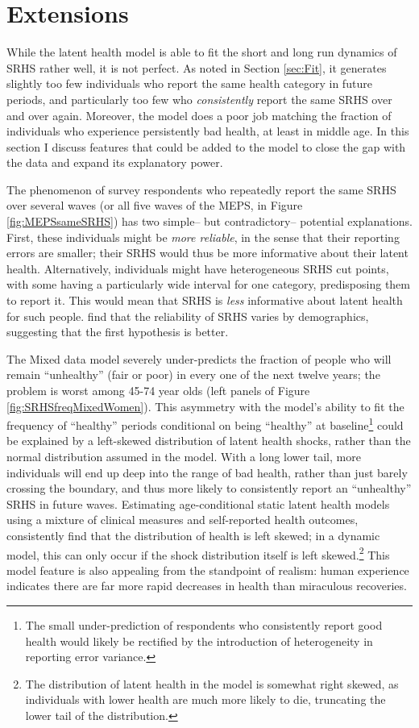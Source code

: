 \section{Extensions}\label{sec:Extensions}

While the latent health model is able to fit the short and long run dynamics of SRHS rather well, it is not perfect.  As noted in Section \ref{sec:Fit}, it generates slightly too few individuals who report the same health category in future periods, and particularly too few who \textit{consistently} report the same SRHS over and over again.  Moreover, the model does a poor job matching the fraction of individuals who experience persistently bad health, at least in middle age.  In this section I discuss features that could be added to the model to close the gap with the data and expand its explanatory power.

The phenomenon of survey respondents who repeatedly report the same SRHS over several waves (or all five waves of the MEPS, in Figure \ref{fig:MEPSsameSRHS}) has two simple-- but contradictory-- potential explanations.  First, these individuals might be \textit{more reliable}, in the sense that their reporting errors are smaller; their SRHS would thus be more informative about their latent health.  Alternatively, individuals might have heterogeneous SRHS cut points, with some having a particularly wide interval for one category, predisposing them to report it.  This would mean that SRHS is \textit{less} informative about latent health for such people.  \cite{Crossley02} find that the reliability of SRHS varies by demographics, suggesting that the first hypothesis is better.

The Mixed data model severely under-predicts the fraction of people who will remain ``unhealthy'' (fair or poor) in every one of the next twelve years; the problem is worst among 45-74 year olds (left panels of Figure \ref{fig:SRHSfreqMixedWomen}).  This asymmetry with the model's ability to fit the frequency of ``healthy'' periods conditional on being ``healthy'' at baseline\footnote{The small under-prediction of respondents who consistently report good health would likely be rectified by the introduction of heterogeneity in reporting error variance.} could be explained by a left-skewed distribution of latent health shocks, rather than the normal distribution assumed in the model.  With a long lower tail, more individuals will end up deep into the range of bad health, rather than just barely crossing the boundary, and thus more likely to consistently report an ``unhealthy'' SRHS in future waves.  Estimating age-conditional static latent health models using a mixture of clinical measures and self-reported health outcomes, \cite{Lange12} consistently find that the distribution of health is left skewed; in a dynamic model, this can only occur if the shock distribution itself is left skewed.\footnote{The distribution of latent health in the model is somewhat right skewed, as individuals with lower health are much more likely to die, truncating the lower tail of the distribution.}  This model feature is also appealing from the standpoint of realism: human experience indicates there are far more rapid decreases in health than miraculous recoveries.

